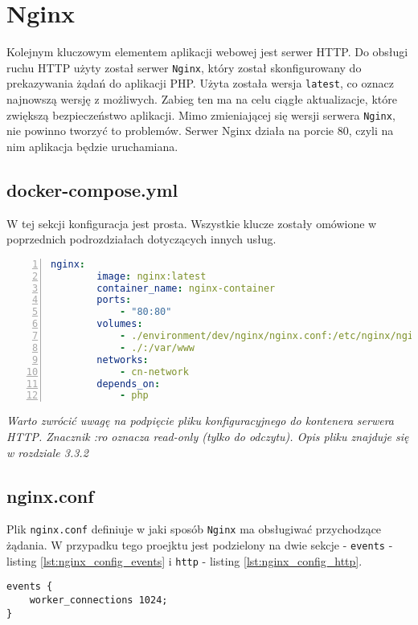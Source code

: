 \section{Nginx}
Kolejnym kluczowym elementem aplikacji webowej jest serwer HTTP. Do obsługi ruchu HTTP użyty został serwer \verb|Nginx|, który został skonfigurowany do prekazywania żądań do aplikacji PHP. Użyta została wersja \verb|latest|, co oznacz najnowszą wersję z możliwych. Zabieg ten ma na celu ciągłe aktualizacje, które zwiększą bezpieczeństwo aplikacji. Mimo zmieniającej się wersji serwera \verb|Nginx|, nie powinno tworzyć to problemów. Serwer Nginx działa na porcie 80, czyli na nim aplikacja będzie uruchamiana.

\subsection{docker-compose.yml}
W tej sekcji konfiguracja jest prosta. Wszystkie klucze zostały omówione w poprzednich podrozdziałach dotyczących innych usług.

\begin{lstlisting}[language=yaml, caption={Konfiguracja kontenera Nginx w pliku docker-compose.yml}, label={lst:docker_compose_nginx}, numbers=left, frame=single]
    nginx:
        image: nginx:latest
        container_name: nginx-container
        ports:
            - "80:80"
        volumes:
            - ./environment/dev/nginx/nginx.conf:/etc/nginx/nginx.conf:ro
            - ./:/var/www
        networks:
            - cn-network
        depends_on:
            - php
\end{lstlisting}

\textit{Warto zwrócić uwagę na podpięcie pliku konfiguracyjnego do kontenera serwera HTTP. Znacznik :ro oznacza read-only (tylko do odczytu). Opis pliku znajduje się w rozdziale 3.3.2}

\subsection{nginx.conf}
Plik \verb|nginx.conf| definiuje w jaki sposób \verb|Nginx| ma obsługiwać przychodzące żądania. W przypadku tego proejktu jest podzielony na dwie sekcje - \verb|events| - listing \ref{lst:nginx_config_events} i \verb|http| - listing \ref{lst:nginx_config_http}.

\begin{lstlisting}[style=nginx, caption={Plik konfiguracyjny nginx.conf - sekcja events}, label={lst:nginx_config_events}]
events {
    worker_connections 1024;
}
\end{lstlisting}

